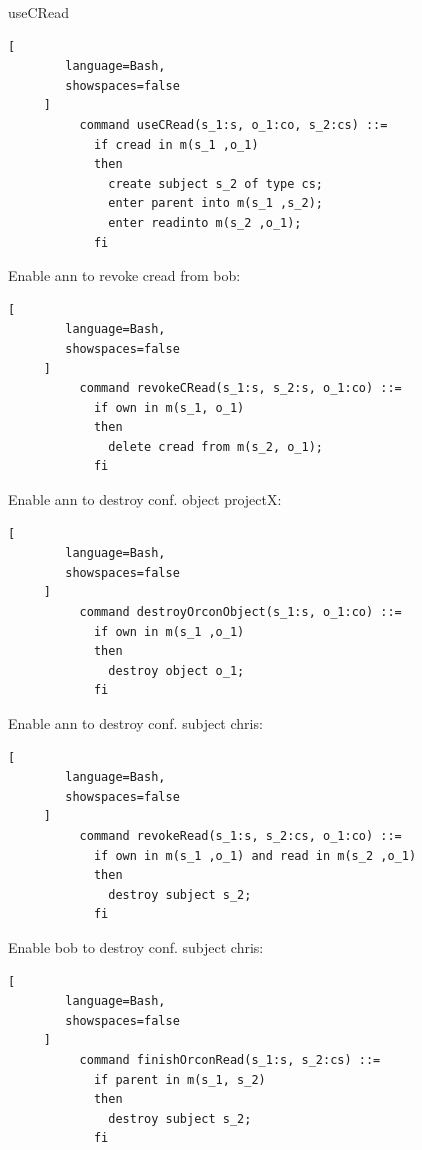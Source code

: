 \documentclass[a4paper]{article}
\begin{document}
\begin{multicols}{3}
\begin{itemize*}
        \item useCRead
        \begin{lstlisting}[
        language=Bash,
        showspaces=false
     ]
          command useCRead(s_1:s, o_1:co, s_2:cs) ::=
            if cread in m(s_1 ,o_1)
            then
              create subject s_2 of type cs;
              enter parent into m(s_1 ,s_2);
              enter readinto m(s_2 ,o_1);
            fi
        \end{lstlisting}

        \item Enable ann to revoke cread from bob:
        \begin{lstlisting}[
        language=Bash,
        showspaces=false
     ]
          command revokeCRead(s_1:s, s_2:s, o_1:co) ::=
            if own in m(s_1, o_1)
            then
              delete cread from m(s_2, o_1);
            fi
        \end{lstlisting}
        \item Enable ann to destroy conf. object projectX:
        \begin{lstlisting}[
        language=Bash,
        showspaces=false
     ]
          command destroyOrconObject(s_1:s, o_1:co) ::=
            if own in m(s_1 ,o_1)
            then
              destroy object o_1;
            fi 
        \end{lstlisting}
        \item Enable ann to destroy conf. subject chris:
        \begin{lstlisting}[
        language=Bash,
        showspaces=false
     ]
          command revokeRead(s_1:s, s_2:cs, o_1:co) ::= 
            if own in m(s_1 ,o_1) and read in m(s_2 ,o_1)
            then
              destroy subject s_2;
            fi
        \end{lstlisting}
        \item Enable bob to destroy conf. subject chris:
        \begin{lstlisting}[
        language=Bash,
        showspaces=false
     ]
          command finishOrconRead(s_1:s, s_2:cs) ::= 
            if parent in m(s_1, s_2)
            then
              destroy subject s_2;
            fi 
        \end{lstlisting}
    \end{itemize*}


\end{multicols}
\end{document}
